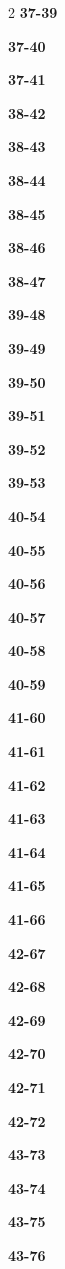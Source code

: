 \documentclass[10pt,a4paper]{article}
\begin{document}
\begin{multicols}{2}
\noindent\textbf{37-39}\ \par
\noindent\textbf{37-40}\ \par
\noindent\textbf{37-41}\ \par
\noindent\textbf{38-42}\ \par
\noindent\textbf{38-43}\ \par
\noindent\textbf{38-44}\ \par
\noindent\textbf{38-45}\ \par
\noindent\textbf{38-46}\ \par
\noindent\textbf{38-47}\ \par
\noindent\textbf{39-48}\ \par
\noindent\textbf{39-49}\ \par
\noindent\textbf{39-50}\ \par
\noindent\textbf{39-51}\ \par
\noindent\textbf{39-52}\ \par
\noindent\textbf{39-53}\ \par
\noindent\textbf{40-54}\ \par
\noindent\textbf{40-55}\ \par
\noindent\textbf{40-56}\ \par
\noindent\textbf{40-57}\ \par
\noindent\textbf{40-58}\ \par
\noindent\textbf{40-59}\ \par
\noindent\textbf{41-60}\ \par
\noindent\textbf{41-61}\ \par
\noindent\textbf{41-62}\ \par
\noindent\textbf{41-63}\ \par
\noindent\textbf{41-64}\ \par
\noindent\textbf{41-65}\ \par
\noindent\textbf{41-66}\ \par
\noindent\textbf{42-67}\ \par
\noindent\textbf{42-68}\ \par
\noindent\textbf{42-69}\ \par
\noindent\textbf{42-70}\ \par
\noindent\textbf{42-71}\ \par
\noindent\textbf{42-72}\ \par
\noindent\textbf{43-73}\ \par
\noindent\textbf{43-74}\ \par
\noindent\textbf{43-75}\ \par
\noindent\textbf{43-76}\ \par

\end{multicols}
\end{document}
